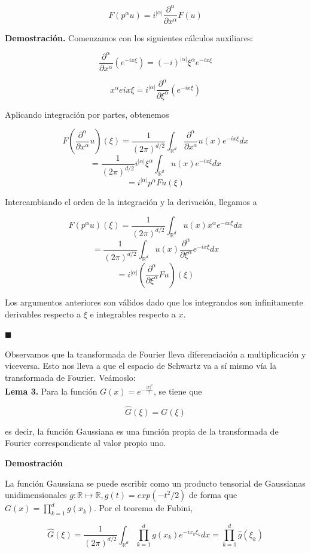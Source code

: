\begin{itemize}
$$F(p^\alpha u) = i^{|\alpha|} \frac{\partial^\alpha }{\partial x^\alpha} F(u)$$

\textbf{Demostración.}
	Comenzamos con los siguientes cálculos auxiliares:
	
	$$\frac{\partial^\alpha }{\partial x^\alpha} (e^{-ix\xi}) = (-i)^{|\alpha|} \xi^\alpha e^{-ix\xi}$$
	
	$$x^\alpha e{ix\xi} = i^{|\alpha|}\frac{\partial^\alpha}{\partial \xi^\alpha}(e^{-ix\xi})$$
	
	Aplicando integración por partes, obtenemos
	
	$$F(\frac{\partial^\alpha}{\partial x^\alpha}u)(\xi) = \frac{1}{(2\pi)^{d/2}}\int_{\mathbb{R}^d} \frac{\partial^\alpha}{\partial x^\alpha} u(x) e^{-ix\xi}dx$$
	$$= \frac{1}{(2\pi)^{d/2}} i^{|\alpha|}\xi^\alpha \int_{\mathbb{R}^d} u(x) e^{-ix\xi}dx$$
	$$=i^{|\alpha|} p^\alpha Fu(\xi)$$
	
Intercambiando el orden de la integración y la derivación, llegamos a

$$F(p^\alpha u)(\xi) = \frac{1}{(2\pi)^{d/2}}\int_{\mathbb{R}^d} u(x)x^\alpha e^{-ix\xi}dx$$
$$=\frac{1}{(2\pi)^{d/2}}\int_{\mathbb{R}^d} u(x)\frac{\partial^\alpha}{\partial \xi^\alpha}e^{-ix\xi}dx$$
$$=i^{|\alpha|}(\frac{\partial^\alpha}{\partial \xi^\alpha}Fu)(\xi)$$

Los argumentos anteriores son válidos dado que los integrandos son infinitamente derivables respecto a $\xi$ e integrables respecto a $x$.

\hfill$\blacksquare$

Observamos que la transformada de Fourier lleva diferenciación a multiplicación y viceversa. Esto nos lleva a que el espacio de Schwartz va a sí mismo vía la transformada de Fourier. Veámoslo:\\

\textbf{Lema 3.} Para la función $G(x) = e^{-\frac{|x|^2}{2}}$, se tiene que 

$$\hat{G}(\xi) = G(\xi)$$

es decir, la función Gaussiana es una función propia de la transformada de Fourier correspondiente al valor propio uno.

\textbf{Demostración}

La función Gaussiana se puede escribir como un producto tensorial de Gaussianas unidimensionales $g:\mathbb{R} \mapsto \mathbb{R}, g(t) = exp(-t^2/2)$ de forma que $G(x) = \prod_{k=1}^{d} g(x_k)$. Por el teorema de Fubini,

$$\hat{G}(\xi) = \frac{1}{(2\pi)^{d/2}} \int_{\mathbb{R}^d} \prod_{k=1}^{d} g(x_k) e^{-i x_k \xi_k} dx = \prod_{k=1}^{d} \hat{g}(\xi_k)$$


\end{itemize}
